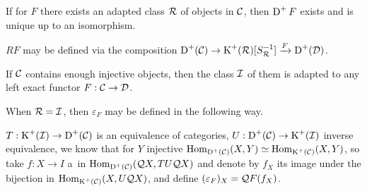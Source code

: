 	\begin{theorem}
		If for $F$ there exists an adapted class ${\mathcal{R}}$ of objects in $\mathcal{C}$, 
		then $\operatorname{D}^+ F$ exists and is unique up to an isomorphism.
	\end{theorem}
	
	\begin{theorem}
		$RF$ may be defined via the composition
		$\operatorname{D}^+(\mathcal{C}) \to \operatorname{K}^+({\mathcal{R}})[S_{{\mathcal{R}}}^{-1}] \xrightarrow{F} \operatorname{D}^+(\mathcal{D})$.
	\end{theorem}
	
	\begin{theorem}
		If $\mathcal{C}$ contains enough injective objects,
		then the class ${\mathcal{I}}$ of them is adapted to 
		any left exact functor $F:\mathcal{C} \to \mathcal{D}$.
	\end{theorem}
	
	\begin{proposition}
		When ${\mathcal{R}} = {\mathcal{I}}$, then $\varepsilon_F$ may be defined
		in the following way.
		
		$T:\operatorname{K}^+({\mathcal{I}}) \to \operatorname{D}^+(\mathcal{C})$ is an equivalence of categories,
		$U:\operatorname{D}^+(\mathcal{C}) \to \operatorname{K}^+({\mathcal{I}})$ inverse equivalence,
		we know that for $Y$ injective $\operatorname{Hom}_{\operatorname{D}^+(\mathcal{C})}(X,Y) \simeq \operatorname{Hom}_{\operatorname{K}^+(\mathcal{C})}(X,Y)$,
		so take $f:X \to I$ a~\qi in $\operatorname{Hom}_{\operatorname{D}^+(\mathcal{C})} (\mathcal{Q} X, TU \mathcal{Q} X)$
		and denote by $f_X$ its image under the bijection
		in $\operatorname{Hom}_{\operatorname{K}^+(\mathcal{C})}(X, U\mathcal{Q} X)$,
		and define $(\varepsilon_F)_X = \mathcal{Q} F(f_X)$.
	\end{proposition}



	
	





 
 
